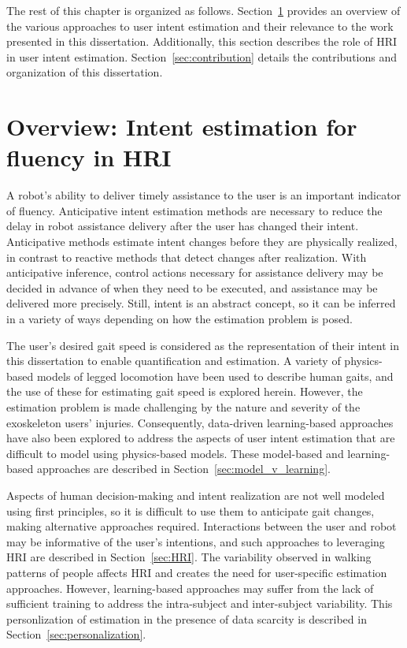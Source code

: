 The rest of this chapter is organized as follows. Section~\ref{sec:overview} provides an overview of the various approaches to user intent estimation and their relevance to the work presented in this dissertation. Additionally, this section describes the role of HRI in user intent estimation. Section~\ref{sec:contribution} details the contributions and organization of this dissertation.

\section{Overview: Intent estimation for fluency in HRI} \label{sec:overview}

A robot's ability to deliver timely assistance to the user is an important indicator of fluency. Anticipative intent estimation methods are necessary to reduce the delay in robot assistance delivery after the user has changed their intent. Anticipative methods estimate intent changes before they are physically realized, in contrast to reactive methods that detect changes after realization. With anticipative inference, control actions necessary for assistance delivery may be decided in advance of when they need to be executed, and assistance may be delivered more precisely. Still, intent is an abstract concept, so it can be inferred in a variety of ways depending on how the estimation problem is posed. 

The user's desired gait speed is considered as the representation of their intent in this dissertation to enable quantification and estimation. A variety of physics-based models of legged locomotion have been used to describe human gaits, and the use of these for estimating gait speed is explored herein. However, the estimation problem is made challenging by the nature and severity of the exoskeleton users' injuries. Consequently, data-driven learning-based approaches have also been explored to address the aspects of user intent estimation that are difficult to model using physics-based models. These model-based and learning-based approaches are described in Section~\ref{sec:model_v_learning}. 

Aspects of human decision-making and intent realization are not well modeled using first principles, so it is difficult to use them to anticipate gait changes, making alternative approaches required. Interactions between the user and robot may be informative of the user's intentions, and such approaches to leveraging HRI are described in Section~\ref{sec:HRI}. The variability observed in walking patterns of people affects HRI and creates the need for user-specific estimation approaches. However, learning-based approaches may suffer from the lack of sufficient training to address the intra-subject and inter-subject variability. This personlization of estimation in the presence of data scarcity is described in Section~\ref{sec:personalization}.

